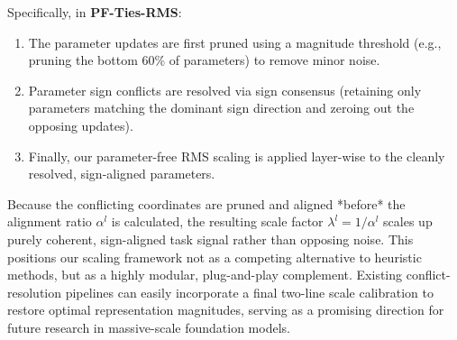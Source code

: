 Specifically, in \textbf{PF-Ties-RMS}:
\begin{enumerate}
    \item The parameter updates are first pruned using a magnitude threshold (e.g., pruning the bottom 60\% of parameters) to remove minor noise.
    \item Parameter sign conflicts are resolved via sign consensus (retaining only parameters matching the dominant sign direction and zeroing out the opposing updates).
    \item Finally, our parameter-free RMS scaling is applied layer-wise to the cleanly resolved, sign-aligned parameters.
\end{enumerate}
Because the conflicting coordinates are pruned and aligned *before* the alignment ratio $\alpha^l$ is calculated, the resulting scale factor $\lambda^l = 1/\alpha^l$ scales up purely coherent, sign-aligned task signal rather than opposing noise. This positions our scaling framework not as a competing alternative to heuristic methods, but as a highly modular, plug-and-play complement. Existing conflict-resolution pipelines can easily incorporate a final two-line scale calibration to restore optimal representation magnitudes, serving as a promising direction for future research in massive-scale foundation models.
